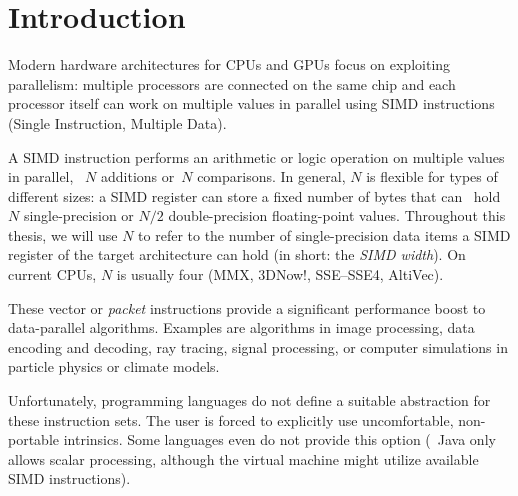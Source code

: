 \chapter{Introduction}
\label{chapter:introduction}




Modern hardware architectures for CPUs and GPUs focus on exploiting parallelism:
multiple processors are connected on the same chip and each processor itself can work on multiple values in parallel using SIMD instructions (Single Instruction, Multiple Data).

A SIMD instruction performs an arithmetic or logic operation on multiple values in parallel, \eg~$N$ additions or~$N$ comparisons.
In general, $N$ is flexible for types of different sizes:
a SIMD register can store a fixed number of bytes that can \eg~hold $N$ single-precision or $N/2$ double-precision floating-point values.
Throughout this thesis, we will use $N$ to refer to the number of single-precision data items a SIMD register of the target architecture can hold (in short: the \emph{SIMD width}).
On current CPUs, $N$ is usually four (MMX, 3DNow!, SSE--SSE4, AltiVec). %

These vector or \emph{packet} instructions provide a significant performance boost to data-parallel algorithms.
Examples are algorithms in image processing, data encoding and decoding, ray tracing, signal processing, or computer simulations in particle physics or climate models.

Unfortunately, programming languages do not define a suitable abstraction for these instruction sets.
The user is forced to explicitly use uncomfortable, non-portable intrinsics.
Some languages even do not provide this option (\eg~Java only allows scalar processing, although the virtual machine might utilize available SIMD instructions).


